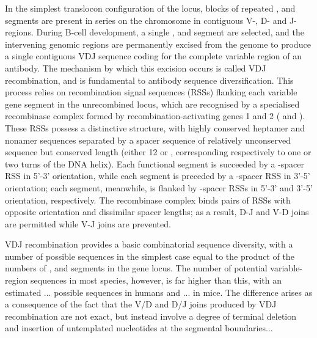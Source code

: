 In the simplest translocon configuration of the \igh{} locus, blocks of repeated \vh, \dh and \jh segments are present in series on the chromosome in contiguous V-, D- and J-regions. During B-cell development, a single \vd, \dh and \jh segment are selected, and the intervening genomic regions are permanently excised from the genome to produce a single contiguous VDJ sequence coding for the complete variable region of an antibody. The mechanism by which this excision occurs is called VDJ recombination, and is fundamental to antibody sequence diversification. This process relies on recombination signal sequences (RSSs) flanking each variable gene segment in the unrecombined locus, which are recognised by a specialised recombinase complex formed by recombination-activating genes 1 and 2 ( and ). These RSSs possess a distinctive structure, with highly conserved heptamer and nonamer sequences separated by a spacer sequence of relatively unconserved sequence but conserved length (either 12 or , corresponding respectively to one or two turns of the DNA helix). Each functional \vh segment is succeeded by a -spacer RSS in 5'-3' orientation, while each \jh segment is preceded by a -spacer RSS in 3'-5' orientation; each \dh segment, meanwhile, is flanked by -spacer RSSs in 5'-3' and 3'-5' orientation, respectively. The recombinase complex binds pairs of RSSs with opposite orientation and dissimilar spacer lengths; as a result, D-J and V-D joins are permitted while V-J joins are prevented. %


VDJ recombination provides a basic combinatorial sequence diversity, with a number of possible sequences in the simplest case equal to the product of the numbers of \vh, \dh and \jh segments in the \igh{} gene locus. The number of potential \igh{} variable-region sequences in most species, however, is far higher than this, with an estimated ... possible sequences in humans and ... in mice. The difference arises as a consequence of the fact that the V/D and D/J joins produced by VDJ recombination are not exact, but instead involve a degree of terminal deletion and insertion of untemplated nucleotides at the segmental boundaries... %

